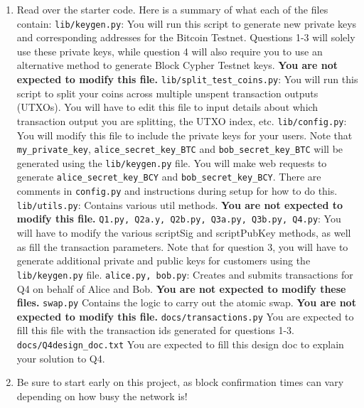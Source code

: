 \documentclass[11pt]{article}
\begin{document}
\begin{enumerate}
\item Read over the starter code. Here is a summary of what each of the files contain:
    \subitem \texttt{lib/keygen.py}:
    \subitem You will run this script to generate new private keys and corresponding addresses for the Bitcoin Testnet. Questions 1-3 will solely use these private keys, while question 4 will also require you to use an alternative method to generate Block Cypher Testnet keys. \textbf{You are not expected to modify this file.}
    \vspace{0.3cm}
    \subitem \texttt{lib/split\_test\_coins.py}:
    \subitem You will run this script to split your coins across multiple unspent transaction outputs (UTXOs). You will have to edit this file to input details about which transaction output you are splitting, the UTXO index, etc.
    \vspace{0.3cm}
    \subitem \texttt{lib/config.py}:
    \subitem You will modify this file to include the private keys for your users. Note that \texttt{my\_private\_key}, \texttt{alice\_secret\_key\_BTC} and \texttt{bob\_secret\_key\_BTC} will be generated using the \texttt{lib/keygen.py} file. You will make web requests to generate \texttt{alice\_secret\_key\_BCY} and \texttt{bob\_secret\_key\_BCY}. There are comments in \texttt{config.py} and instructions during setup for how to do this.
    \vspace{0.3cm}
    \subitem \texttt{lib/utils.py}:
    \subitem Contains various util methods. \textbf{You are not expected to modify this file.}
    \vspace{0.3cm}
    \subitem \texttt{Q1.py, Q2a.y, Q2b.py, Q3a.py, Q3b.py, Q4.py}:
    \subitem You will have to modify the various scriptSig and scriptPubKey methods, as well as fill the transaction parameters. Note that for question 3, you will have to generate additional private and public keys for customers using the \texttt{lib/keygen.py} file.
    \vspace{0.3cm}
    \subitem \texttt{alice.py, bob.py}:
    \subitem Creates and submits transactions for Q4 on behalf of Alice and Bob. \textbf{You are not expected to modify these files.}
    \vspace{0.3cm}
    \subitem \texttt{swap.py}
    \subitem Contains the logic to carry out the atomic swap. \textbf{You are not expected to modify this file.}
    \vspace{0.3cm}
    \subitem \texttt{docs/transactions.py}
    \subitem You are expected to fill this file with the transaction ids generated for questions 1-3.
    \vspace{0.3cm}
    \subitem \texttt{docs/Q4design\_doc.txt}
    \subitem You are expected to fill this design doc to explain your solution to Q4.

\item Be sure to start early on this project, as block confirmation times can vary depending on how busy the network is!

\end{enumerate}
\end{document}
